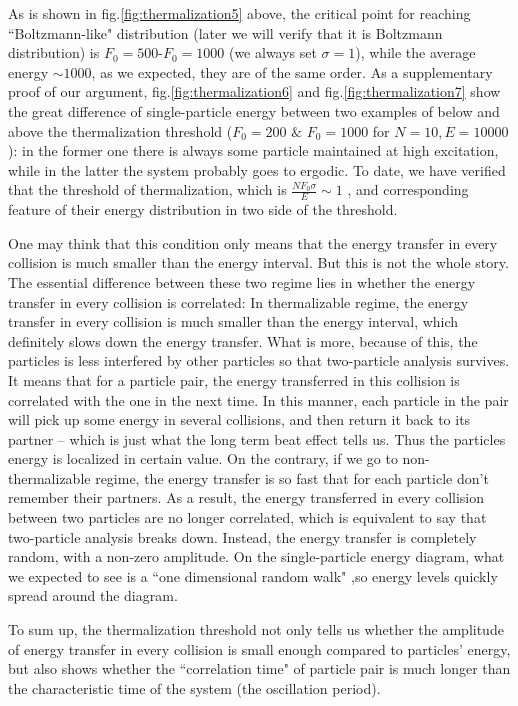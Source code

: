 \documentclass[aps,pre,twocolumn,groupedaddress]{revtex4-1}
\begin{document}
As is shown in fig.\ref{fig:thermalization5} above, the critical point for reaching ``Boltzmann-like" distribution (later we will verify that it is Boltzmann distribution) is $F_0=500$-$F_0=1000$ (we always set $\sigma=1$), while the average energy $\sim 1000$, as we expected, they are of the same order. As a supplementary proof of our argument, fig.\ref{fig:thermalization6} and fig.\ref{fig:thermalization7} show the great difference of single-particle energy between two examples of below and above the thermalization threshold ($F_0=200$ $\&$ $F_0=1000$ for $N=10, E=10000$): in the former one there is always some particle maintained at high excitation, while in the latter the system probably goes to ergodic. To date, we have verified that the threshold of thermalization, which is $\frac{NF_0\sigma}{E}\sim1 $ , and corresponding feature of their energy distribution in two side of the threshold.

One may think that this condition only means that the energy transfer in every collision is much smaller than the energy interval. But this is not the whole story. The essential difference between these two regime lies in whether the energy transfer in every collision is correlated: In thermalizable regime, the energy transfer in every collision is much smaller than the energy interval, which definitely slows down the energy transfer. What is more, because of this, the particles is less interfered by other particles so that two-particle analysis survives. It means that for a particle pair, the energy transferred in this collision is correlated with the one in the next time. In this manner, each particle in the pair will pick up some energy in several collisions, and then return it back to its partner -- which is just what the long term beat effect tells us. Thus the particles energy is localized in certain value. On the contrary, if we go to non-thermalizable regime, the energy transfer is so fast that for each particle don't remember their partners. As a result, the energy transferred in every collision between two particles are no longer correlated, which is equivalent to say that two-particle analysis breaks down. Instead, the energy transfer is completely random, with a non-zero amplitude. On the single-particle energy diagram, what we expected to see is a ``one dimensional random walk" ,so energy levels quickly spread around the diagram.

To sum up, the thermalization threshold not only tells us whether the amplitude of energy transfer in every collision is small enough compared to particles' energy, but also shows whether the ``correlation time" of particle pair is much longer than the characteristic time of the system (the oscillation period).  
\end{document}
